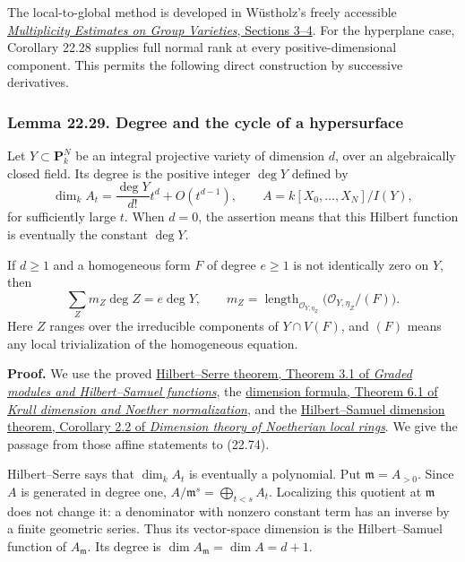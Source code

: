 \documentclass[
  11pt,
  a4paper,
]{article}
\begin{document}
The local-to-global method is developed in Wüstholz's freely accessible
\href{https://archive.mpim-bonn.mpg.de/1364/1/preprint_1984_13.pdf}{\emph{Multiplicity
Estimates on Group Varieties}, Sections 3--4}. For the hyperplane case,
Corollary 22.28 supplies full normal rank at every positive-dimensional
component. This permits the following direct construction by successive
derivatives.

\subsubsection{Lemma 22.29. Degree and the cycle of a
hypersurface}\label{lemma-22.29.-degree-and-the-cycle-of-a-hypersurface}

Let \(Y\subset\mathbf P^N_k\) be an integral projective variety of
dimension \(d\), over an algebraically closed field. Its degree is the
positive integer \(\deg Y\) defined by \[
 \dim_k A_t=\frac{\deg Y}{d!}t^d+O(t^{d-1}),
 \qquad A=k[X_0,\ldots,X_N]/I(Y),
 \tag{22.73}
\] for sufficiently large \(t\). When \(d=0\), the assertion means that
this Hilbert function is eventually the constant \(\deg Y\).

If \(d\ge1\) and a homogeneous form \(F\) of degree \(e\ge1\) is not
identically zero on \(Y\), then \[
 \sum_Z m_Z\deg Z=e\deg Y,
 \qquad
 m_Z=\operatorname{length}_{\mathcal O_{Y,\eta_Z}}
          \bigl(\mathcal O_{Y,\eta_Z}/(F)\bigr).
 \tag{22.74}
\] Here \(Z\) ranges over the irreducible components of \(Y\cap V(F)\),
and \((F)\) means any local trivialization of the homogeneous equation.

\textbf{Proof.} We use the proved
\href{https://kokunoyumeto.github.io/open-math-courses-public/courses/AG-CA/AG-CA-10.html}{Hilbert--Serre theorem, Theorem 3.1 of
\emph{Graded modules and Hilbert--Samuel functions}}, the
\href{https://kokunoyumeto.github.io/open-math-courses-public/courses/AG-CA/AG-CA-09.html}{dimension formula, Theorem 6.1 of
\emph{Krull dimension and Noether normalization}}, and the
\href{https://kokunoyumeto.github.io/open-math-courses-public/courses/AG-CA/AG-CA-11.html}{Hilbert--Samuel dimension theorem,
Corollary 2.2 of \emph{Dimension theory of Noetherian local rings}}. We
give the passage from those affine statements to (22.74).

Hilbert--Serre says that \(\dim_k A_t\) is eventually a polynomial. Put
\(\mathfrak m=A_{>0}\). Since \(A\) is generated in degree one,
\(A/\mathfrak m^s=\bigoplus_{t<s}A_t\). Localizing this quotient at
\(\mathfrak m\) does not change it: a denominator with nonzero constant
term has an inverse by a finite geometric series. Thus its vector-space
dimension is the Hilbert--Samuel function of \(A_{\mathfrak m}\). Its
degree is \(\dim A_{\mathfrak m}=\dim A=d+1\).
\end{document}
